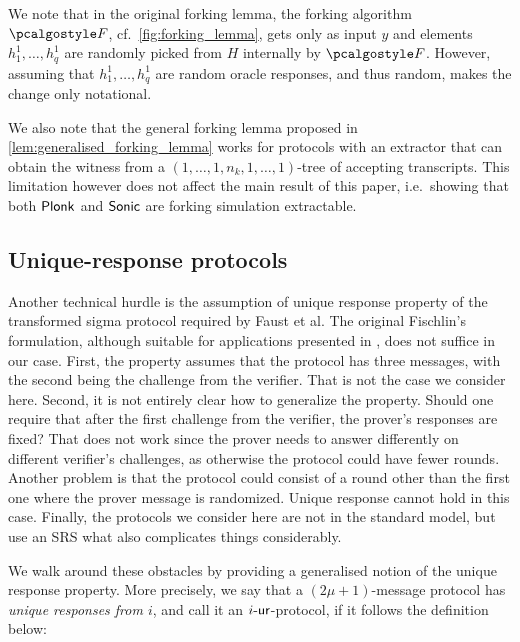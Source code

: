 We note that in the original forking lemma, the forking algorithm $\forking$,
cf.~\cref{fig:forking_lemma}, gets only as input $y$ and elements $h^1_1, \ldots,
h^1_q$ are randomly picked from $H$ internally by $\forking$. However, assuming
that $h^1_1, \ldots, h^1_q$ are random oracle responses, and thus random, makes
the change only notational.

We also note that the general forking lemma proposed in
\cref{lem:generalised_forking_lemma} works for protocols with an extractor that can obtain the
witness from a $(1, \ldots, 1, n_k, 1, \ldots, 1)$-tree of accepting
transcripts. This limitation however does not affect the main result of this
paper, i.e.~showing that both $\textnormal{\textsf{Plonk}}$ and ${\textnormal{\textsf{Sonic}}}$ are forking simulation extractable.

\subsection{Unique-response protocols}
Another technical hurdle is the assumption of unique response property 
of the transformed sigma protocol required by Faust et al. The original
Fischlin's formulation, although suitable for applications presented in
\cite{C:Fischlin05,INDOCRYPT:FKMV12}, does not suffice in our case. First,
the property assumes that the protocol has three messages, with the second being
the challenge from the verifier. That is not the case we consider here. Second,
it is not entirely clear how to generalize the property. Should one require that
after the first challenge from the verifier, the prover's responses are fixed?
That does not work since the prover needs to answer differently on different
verifier's challenges, as otherwise the protocol could have fewer
rounds. Another problem is that the protocol could consist of
a round other than the first one where the prover message is randomized.
Unique response cannot hold in this case. Finally, the protocols we
consider here are not in the standard model, but use an SRS
what also complicates things considerably.

We walk around these obstacles by providing a generalised notion of the unique
response property. More precisely, we say that a $(2\mu + 1)$-message protocol
has \emph{unique responses from $i$}, and call it an ${i\text{-}\mathsf{ur}}$-protocol, if it
follows the definition below:

